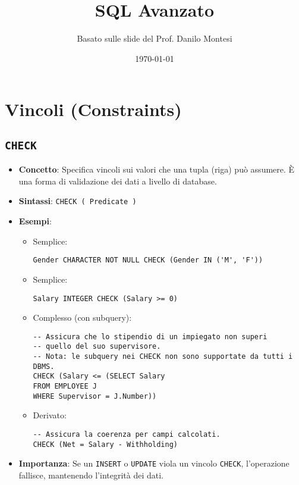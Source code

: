 

\usepackage{hyperref}

\title{SQL Avanzato}
\author{Basato sulle slide del Prof. Danilo Montesi}
\date{\today}


	
	\maketitle
	\tableofcontents
	\newpage
	
	\section{Vincoli (Constraints)}
	
	\subsection{\texttt{CHECK}}
	\begin{itemize}
		\item \textbf{Concetto}: Specifica vincoli sui valori che una tupla (riga) può assumere. È una forma di validazione dei dati a livello di database.
		\item \textbf{Sintassi}: \texttt{CHECK ( Predicate )}
		\item \textbf{Esempi}:
		\begin{itemize}
			\item Semplice:
			\begin{verbatim}
Gender CHARACTER NOT NULL CHECK (Gender IN ('M', 'F'))
			\end{verbatim}
			\item Semplice:
			\begin{verbatim}
Salary INTEGER CHECK (Salary >= 0)
			\end{verbatim}
			\item Complesso (con subquery):
			\begin{verbatim}
-- Assicura che lo stipendio di un impiegato non superi
-- quello del suo supervisore.
-- Nota: le subquery nei CHECK non sono supportate da tutti i DBMS.
CHECK (Salary <= (SELECT Salary
FROM EMPLOYEE J
WHERE Supervisor = J.Number))
			\end{verbatim}
			\item Derivato:
			\begin{verbatim}
-- Assicura la coerenza per campi calcolati.
CHECK (Net = Salary - Withholding)
			\end{verbatim}
		\end{itemize}
		\item \textbf{Importanza}: Se un \texttt{INSERT} o \texttt{UPDATE} viola un vincolo \texttt{CHECK}, l'operazione fallisce, mantenendo l'integrità dei dati.
	\end{itemize}
	
